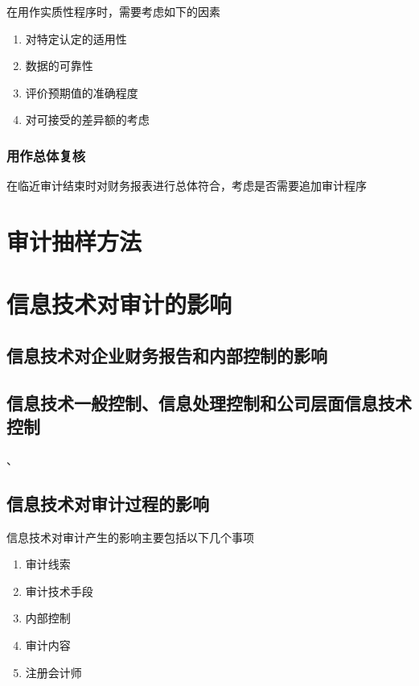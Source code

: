 \documentclass[UTF8,12pt]{ctexart}
\numberwithin{equation}{section} %
\numberwithin{figure}{section}
\numberwithin{table}{section}
\begin{document}
	在用作实质性程序时，需要考虑如下的因素
	\begin{enumerate}
		\item 对特定认定的适用性
		
		\item 数据的可靠性
		
		\item 评价预期值的准确程度
		
		\item 对可接受的差异额的考虑
	\end{enumerate}
	
	
	\subsubsection{用作总体复核}
	在临近审计结束时对财务报表进行总体符合，考虑是否需要追加审计程序
	
	\newpage
	\section{审计抽样方法}
	
	\newpage
	\section{信息技术对审计的影响}
	\subsection{信息技术对企业财务报告和内部控制的影响}
	
	\subsection{信息技术一般控制、信息处理控制和公司层面信息技术控制}、
	
	\subsection{信息技术对审计过程的影响}
	信息技术对审计产生的影响主要包括以下几个事项
	\begin{enumerate}
		\item 审计线索
		
		\item 审计技术手段
		
		\item 内部控制
		
		\item 审计内容
		
		\item 注册会计师
	\end{enumerate}
	
\end{document}
